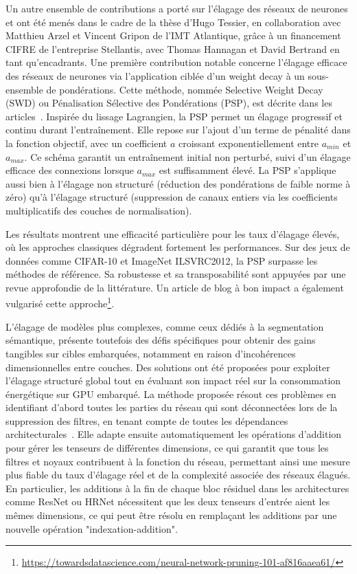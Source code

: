 \documentclass[11pt]{report}
\begin{document}
Un autre ensemble de contributions a porté sur l'élagage des réseaux de neurones et ont été menés dans le cadre de la thèse d'Hugo Tessier, en collaboration avec Matthieu Arzel et Vincent Gripon de l'IMT Atlantique, grâce à un financement CIFRE de l'entreprise Stellantis, avec Thomas Hannagan et David Bertrand en tant qu'encadrants.
Une première contribution notable concerne l'élagage efficace des réseaux de neurones via l'application ciblée d'un weight decay à un sous-ensemble de pondérations. Cette méthode, nommée Selective Weight Decay (SWD) ou Pénalisation Sélective des Pondérations (PSP), est décrite dans les articles~\cite{tessier:hal-03675138,tessier:hal-03695958}. Inspirée du lissage Lagrangien, la PSP permet un élagage progressif et continu durant l'entraînement. Elle repose sur l'ajout d'un terme de pénalité dans la fonction objectif, avec un coefficient $a$ croissant exponentiellement entre $a_{min}$ et $a_{max}$. Ce schéma garantit un entraînement initial non perturbé, suivi d'un élagage efficace des connexions lorsque $a_{max}$ est suffisamment élevé.
La PSP s'applique aussi bien à l'élagage non structuré (réduction des pondérations de faible norme à zéro) qu'à l'élagage structuré (suppression de canaux entiers via les coefficients multiplicatifs des couches de normalisation).

Les résultats montrent une efficacité particulière pour les taux d'élagage élevés, où les approches classiques dégradent fortement les performances. Sur des jeux de données comme CIFAR-10 et ImageNet ILSVRC2012, la PSP surpasse les méthodes de référence. Sa robustesse et sa transposabilité sont appuyées par une revue approfondie de la littérature. Un article de blog à bon impact a également vulgarisé cette approche\footnote{\url{https://towardsdatascience.com/neural-network-pruning-101-af816aaea61/}}.

L'élagage de modèles plus complexes, comme ceux dédiés à la segmentation sémantique, présente toutefois des défis spécifiques pour obtenir des gains tangibles sur cibles embarquées, notamment en raison d'incohérences dimensionnelles entre couches. Des solutions ont été proposées pour exploiter l'élagage structuré global tout en évaluant son impact réel sur la consommation énergétique sur GPU embarqué.
La méthode proposée résout ces problèmes en identifiant d'abord toutes les parties du réseau qui sont déconnectées lors de la suppression des filtres, en tenant compte de toutes les dépendances architecturales~\cite{tessier:hal-03706472}. Elle adapte ensuite automatiquement les opérations d'addition pour gérer les tenseurs de différentes dimensions, ce qui garantit que tous les filtres et noyaux contribuent à la fonction du réseau, permettant ainsi une mesure plus fiable du taux d'élagage réel et de la complexité associée des réseaux élagués. En particulier, les additions à la fin de chaque bloc résiduel dans les architectures comme ResNet ou HRNet nécessitent que les deux tenseurs d'entrée aient les mêmes dimensions, ce qui peut être résolu en remplaçant les additions par une nouvelle opération "indexation-addition".
\end{document}
